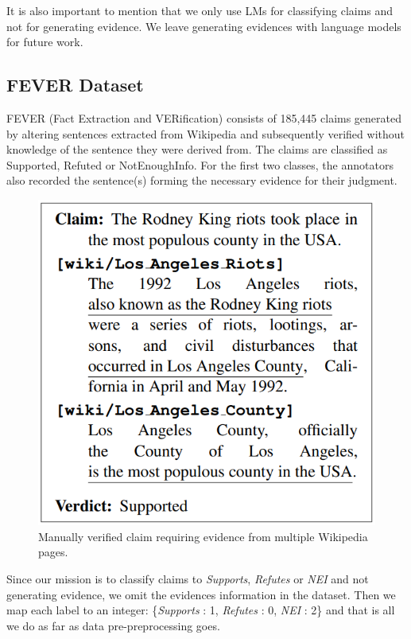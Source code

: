 \documentclass[conference]{IEEEtran}
\begin{document}
It is also important to mention that we only use LMs for classifying claims and not for generating evidence. We leave generating evidences with language models for future work.

\subsection{FEVER Dataset}
FEVER (Fact Extraction and VERification) consists of 185,445 claims generated by altering sentences extracted from Wikipedia and subsequently verified without knowledge of the sentence they were derived from. The claims are classified as Supported, Refuted or NotEnoughInfo. For the first two classes, the annotators also recorded the sentence(s) forming the necessary evidence for their judgment\cite{thorne2018fever}.

\begin{figure}[htp]
    \centering
    \includegraphics[scale=0.3]{fever_example.png}
    \caption{Manually verified claim requiring evidence from multiple Wikipedia pages.}
    \label{fig:fever_example}
\end{figure}

Since our mission is to classify claims to \textit{Supports}, \textit{Refutes} or \textit{NEI} and not generating evidence, we omit the evidences information in the dataset. Then we map each label to an integer: \{\textit{Supports} : 1, \textit{Refutes} : 0, \textit{NEI} : 2\} and that is all we do as far as data pre-preprocessing goes.
\end{document}
